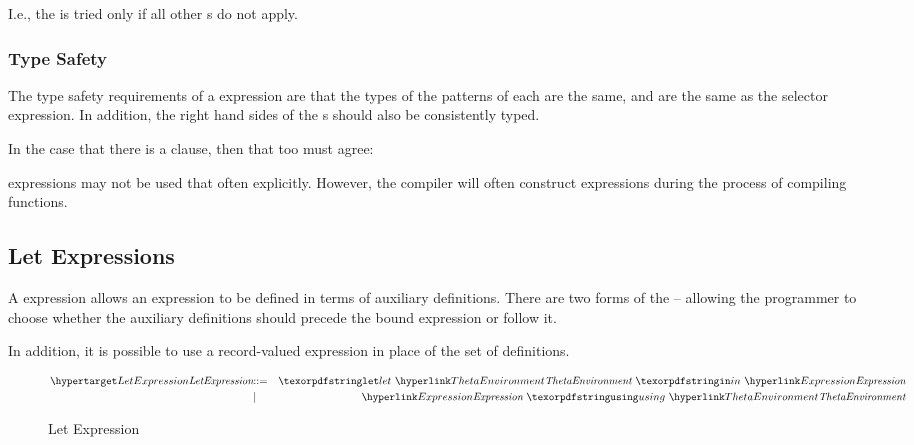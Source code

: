 \begin{aside}
I.e., the   is tried only if all other s do not apply.

\subsubsection{Type Safety}
The type safety requirements of a  expression are that the types of the patterns of each  are the same, and are the same as the selector expression. In addition, the right hand sides of the s should also be consistently typed.

\begin{prooftree}
\end{prooftree}

In the case that there is a  clause, then that too must agree:
\begin{prooftree}
\end{prooftree}

 expressions may not be used that often explicitly. However, the compiler will often construct  expressions during the process of compiling functions.
\end{aside}

\subsection{Let Expressions}
\label{letExpression}

A  expression allows an expression to be defined in terms of  auxiliary definitions. There are two forms of the  -- allowing the programmer to choose whether the auxiliary definitions should precede the bound expression or follow it.

In addition, it is possible to use a record-valued expression in place of the set of definitions.

\begin{figure}[htbp]
\begin{eqnarray*}
\ntDef{LetExpression}&\arrow&\q{let}\ \ntRef{ThetaEnvironment}\ \q{in}\ \ntRef{Expression}\\
&\choice&\ntRef{Expression}\ \q{using}\ \ntRef{ThetaEnvironment}
\end{eqnarray*}
\caption{Let Expression}
\label{letExpressionFig}
\end{figure}

